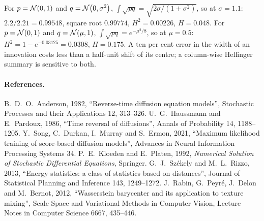 \begin{example}
\label{ex:rev:hellinger}
For $p=\mathcal{N}\!\left(0,1\right)$ and $q=\mathcal{N}\!\left(0,\sigma^2\right)$, $\int\sqrt{pq}=\sqrt{2\sigma/(1+\sigma^2)}$,
so at $\sigma=1.1$: $2.2/2.21=0.99548$, square root $0.99774$, $H^2=0.00226$,
$H=0.048$. For $p=\mathcal{N}\!\left(0,1\right)$ and $q=\mathcal{N}\!\left(\mu,1\right)$, $\int\sqrt{pq}=e^{-\mu^2/8}$, so at
$\mu=0.5$: $H^2=1-e^{-0.03125}=0.0308$, $H=0.175$. A ten per cent error in the width
of an innovation costs less than a half-unit shift of its centre; a column-wise
Hellinger summary is sensitive to both.
\end{example}

\begingroup\setlength{\emergencystretch}{2em}
\endgroup

\paragraph{References.}
B.~D.~O.~Anderson, 1982, ``Reverse-time diffusion equation models'', Stochastic
Processes and their Applications 12, 313--326.
U.~G.~Haussmann and E.~Pardoux, 1986, ``Time reversal of diffusions'', Annals of
Probability 14, 1188--1205.
Y.~Song, C.~Durkan, I.~Murray and S.~Ermon, 2021, ``Maximum likelihood training of
score-based diffusion models'', Advances in Neural Information Processing Systems 34.
P.~E.~Kloeden and E.~Platen, 1992, \emph{Numerical Solution of Stochastic Differential
Equations}, Springer.
G.~J.~Sz\'ekely and M.~L.~Rizzo, 2013, ``Energy statistics: a class of statistics based
on distances'', Journal of Statistical Planning and Inference 143, 1249--1272.
J.~Rabin, G.~Peyr\'e, J.~Delon and M.~Bernot, 2012, ``Wasserstein barycenter and its
application to texture mixing'', Scale Space and Variational Methods in Computer
Vision, Lecture Notes in Computer Science 6667, 435--446.
